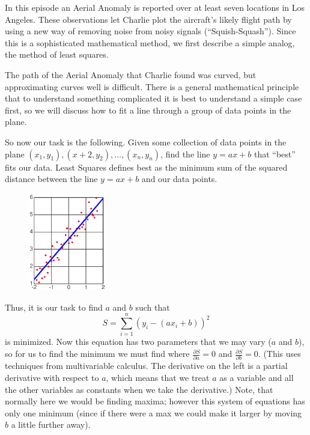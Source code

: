 \newpage
{}
{}
\setcounter{activity}{0}

In this episode an Aerial Anomaly is reported over at least seven locations in Los Angeles. These observations let Charlie plot the aircraft's likely flight path by using a new way of removing noise from noisy signals (``Squish-Squash''). Since this is a sophisticated mathematical method, we first describe a simple analog, the method of least squares.




The path of the Aerial Anomaly that Charlie found was curved, but approximating curves well is difficult. There is a general mathematical principle that to understand something complicated it is best to understand a simple case first, so we will discuss how to fit a line through a group of data points in the plane. 


So now our task is the following. Given some collection of data points in the plane $(x_1,y_1), (x+2,y_2), \ldots, (x_n,y_n)$, find the line $y= ax + b$ that ``best'' fits our data. Least Squares defines best as the minimum sum of the squared distance between the line $y= ax + b$ and our data points.


	\begin{figure}[H]
	\centering
	\includegraphics[width=0.3\textwidth]{../sections/seasons/season1/112/images/data.jpg} 
	\end{figure}




Thus, it is our task to find $a$ and $b$ such that 
	\[
	S= \sum_{i=1}^n (y_i - (ax_i + b))^2
	\]
 is minimized. Now this equation has two parameters that we may vary ($a$ and $b$), so for us to find the minimum we must find where $\frac{\partial S}{\partial a}= 0$ and $\frac{\partial S}{\partial b}= 0$. (This uses techniques from multivariable calculus. The derivative on the left is a partial derivative with respect to $a$, which means that we treat $a$ as a variable and all the other variables as constants when we take the derivative.) Note, that normally here we would be finding maxima; however this system of equations has only one minimum (since if there were a max we could make it larger by moving $b$ a little further away).


